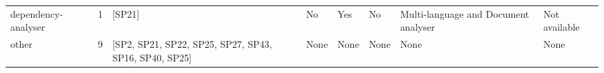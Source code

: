 \begin{tabular}{lrllllll}
 dependency-analyser &      1 &                                                 [SP21] &    No &      Yes &        No &                                                                                                                                                    Multi-language and Document analyser &                                                                                                                                                                                                                                                                                                                                                                                                    Not available \\
               other &      9 &  [SP2, SP21, SP22, SP25, SP27, SP43, SP16, SP40, SP25] &  None &     None &      None &                                                                                                                                                                                    None &                                                                                                                                                                                                                                                                                                                                                                                                             None \\
\bottomrule
\end{tabular}

